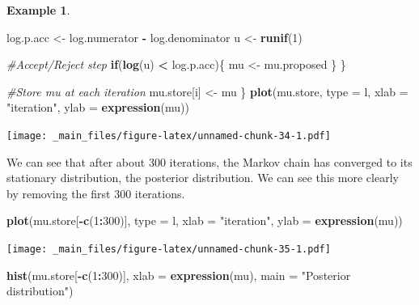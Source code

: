 \documentclass[
]{book}
\newenvironment{Shaded}{\begin{snugshade}}{\end{snugshade}}
\newcommand{\AttributeTok}[1]{\textcolor[rgb]{0.13,0.29,0.53}{#1}}
\newcommand{\CommentTok}[1]{\textcolor[rgb]{0.56,0.35,0.01}{\textit{#1}}}
\newcommand{\ControlFlowTok}[1]{\textcolor[rgb]{0.13,0.29,0.53}{\textbf{#1}}}
\newcommand{\DecValTok}[1]{\textcolor[rgb]{0.00,0.00,0.81}{#1}}
\newcommand{\FunctionTok}[1]{\textcolor[rgb]{0.13,0.29,0.53}{\textbf{#1}}}
\newcommand{\NormalTok}[1]{#1}
\newcommand{\OtherTok}[1]{\textcolor[rgb]{0.56,0.35,0.01}{#1}}
\newcommand{\SpecialCharTok}[1]{\textcolor[rgb]{0.81,0.36,0.00}{\textbf{#1}}}
\newcommand{\StringTok}[1]{\textcolor[rgb]{0.31,0.60,0.02}{#1}}
\theoremstyle{definition}
\theoremstyle{definition}
\newtheorem{example}{Example}[chapter]
\theoremstyle{definition}
\theoremstyle{definition}
\theoremstyle{remark}
\begin{document}
\begin{example}
\begin{Shaded}
\begin{Highlighting}[]
\NormalTok{    log.p.acc }\OtherTok{\textless{}{-}}\NormalTok{ log.numerator }\SpecialCharTok{{-}}\NormalTok{ log.denominator}
\NormalTok{    u }\OtherTok{\textless{}{-}} \FunctionTok{runif}\NormalTok{(}\DecValTok{1}\NormalTok{)}
    
    \CommentTok{\#Accept/Reject step}
    \ControlFlowTok{if}\NormalTok{(}\FunctionTok{log}\NormalTok{(u) }\SpecialCharTok{\textless{}}\NormalTok{ log.p.acc)\{}
\NormalTok{      mu }\OtherTok{\textless{}{-}}\NormalTok{ mu.proposed}
\NormalTok{    \}}
\NormalTok{  \}}
  
  \CommentTok{\#Store mu at each iteration}
\NormalTok{  mu.store[i] }\OtherTok{\textless{}{-}}\NormalTok{ mu}
\NormalTok{\}}
\FunctionTok{plot}\NormalTok{(mu.store, }\AttributeTok{type =} \StringTok{\textquotesingle{}l\textquotesingle{}}\NormalTok{, }\AttributeTok{xlab =} \StringTok{"iteration"}\NormalTok{, }
     \AttributeTok{ylab =} \FunctionTok{expression}\NormalTok{(mu))}
\end{Highlighting}
\end{Shaded}

\texttt{[image: \_main\_files/figure-latex/unnamed-chunk-34-1.pdf]}

We can see that after about 300 iterations, the Markov chain has converged to its stationary distribution, the posterior distribution. We can see this more clearly by removing the first 300 iterations.

\begin{Shaded}
\begin{Highlighting}[]
\FunctionTok{plot}\NormalTok{(mu.store[}\SpecialCharTok{{-}}\FunctionTok{c}\NormalTok{(}\DecValTok{1}\SpecialCharTok{:}\DecValTok{300}\NormalTok{)], }\AttributeTok{type =} \StringTok{\textquotesingle{}l\textquotesingle{}}\NormalTok{, }\AttributeTok{xlab =} \StringTok{"iteration"}\NormalTok{, }\AttributeTok{ylab =} \FunctionTok{expression}\NormalTok{(mu))}
\end{Highlighting}
\end{Shaded}

\texttt{[image: \_main\_files/figure-latex/unnamed-chunk-35-1.pdf]}

\begin{Shaded}
\begin{Highlighting}[]
\FunctionTok{hist}\NormalTok{(mu.store[}\SpecialCharTok{{-}}\FunctionTok{c}\NormalTok{(}\DecValTok{1}\SpecialCharTok{:}\DecValTok{300}\NormalTok{)], }\AttributeTok{xlab =} \FunctionTok{expression}\NormalTok{(mu), }\AttributeTok{main =} \StringTok{"Posterior distribution"}\NormalTok{)}
\end{Highlighting}
\end{Shaded}


\end{example}
\end{document}

